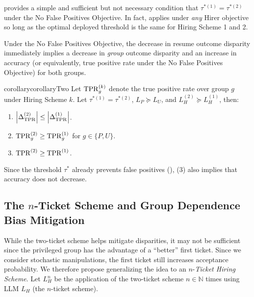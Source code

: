         \begin{remark}
             provides a simple and sufficient but not necessary condition that \(\tau^{*(1)} = \tau^{*(2)}\) under the No False Positives Objective. In fact,  applies under \emph{any} Hirer objective so long as the optimal deployed threshold is the same for Hiring Scheme 1 and 2.
        \end{remark}

        Under the No False Positives Objective, the decrease in resume outcome disparity immediately implies a decrease in \emph{group} outcome disparity and an increase in accuracy (or equivalently, true positive rate under the No False Positives Objective) for both groups. 
        
        \begin{restatable}{corollary}{corollaryTwo}
            \label{cor: two-ticket improves group fairness and accuracy}
             Let \(\mathrm{TPR}_g^{(k)}\) denote the true positive rate over group \(g\) under Hiring Scheme \(k\). Let \(\tau^{*(1)} = \tau^{*(2)}\), \(L_P \succeq L_U\), and \(L_H^{(2)} \succeq L_H^{(1)}\), then: 
            \begin{enumerate}
                \item 
                \(\left| \Delta_{\mathrm{TPR}}^{(2)} \right| \leq \left| \Delta_{\mathrm{TPR}}^{(1)} \right|\).

                \item \(\mathrm{TPR}_g^{(2)} \geq \mathrm{TPR}_g^{(1)}\) for \(g \in \{P, U\}\).
                
                \item \(\mathrm{TPR}^{(2)} \geq \mathrm{TPR}^{(1)}\).
            \end{enumerate}
        \end{restatable}
        Since the threshold $\tau^*$ already prevents false positives (), (3) also implies that accuracy does not decrease.

\subsection{The $n$-Ticket Scheme and Group Dependence Bias Mitigation}
While the two-ticket scheme helps mitigate disparities, it may not be sufficient since the privileged group has the advantage of a ``better'' first ticket. Since we consider stochastic manipulations, the first ticket still increases acceptance probability. We therefore propose generalizing the idea to an $n$-\textit{Ticket Hiring Scheme}. Let $L_H^{n}$ be the application of the two-ticket scheme $n\in \mathbb N$ times using LLM $L_H$ (the $n$-ticket scheme).

